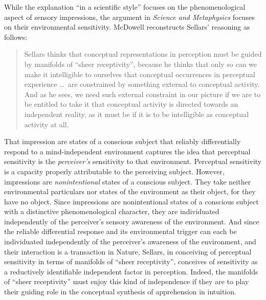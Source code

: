 \documentclass[12pt]{article}
\begin{document}
While the explanation ``in a scientific style'' focuses on the phenomenological aspect of sensory impressions, the argument in \emph{Science and Metaphysics} focuses on their environmental sensitivity. McDowell reconstructs Sellars' reasoning as follows:
\begin{quote}
    Sellars thinks that conceptual representations in perception must be guided by manifolds of ``sheer receptivity'', because he thinks that only so can we make it intelligible to ourselves that conceptual occurrences in perceptual experience \ldots\ are constrained by something external to conceptual activity. And as he sees, we need such external constraint in our picture if we are to be entitled to take it that conceptual activity is directed towards an independent reality, as it must be if it is to be intelligible as conceptual activity at all.
\end{quote}

That impression are states of a conscious subject that reliably differentially respond to a mind-independent environment captures the idea that perceptual sensitivity is the \emph{perceiver's} sensitivity to that environment. Perceptual sensitivity is a capacity properly attributable to the perceiving subject. However, impressions are \emph{nonintentional} states of a conscious subject. They take neither environmental particulars nor states of the environment as their object, for they have no object. Since impressions are nonintentional states of a conscious subject with a distinctive phenomenological character, they are individuated independently of the perceiver's sensory awareness of the environment. And since the reliable differential response and its environmental trigger can each be individuated independently of the perceiver's awareness of the environment, and their interaction is a transaction in Nature, Sellars, in conceiving of perceptual sensitivity in terms of manifolds of ``sheer receptivity'', conceives of sensitivity as a reductively identifiable independent factor in perception.  Indeed, the manifolds of ``sheer receptivity'' must enjoy this kind of independence if they are to play their guiding role in the conceptual synthesis of apprehension in intuition.
\end{document}
